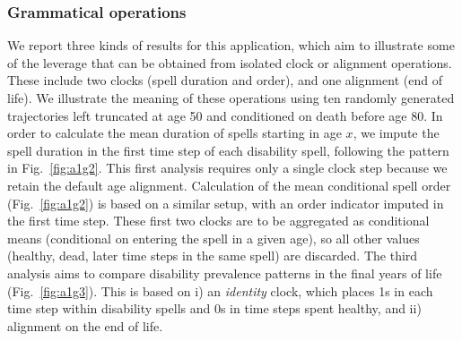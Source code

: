 \documentclass{article}
\begin{document}
\subsubsection{Grammatical operations}
We report three kinds of results for this application, which aim to illustrate some of the leverage that can be obtained from isolated clock or alignment operations. These include two clocks (spell duration and order), and one alignment (end of life). We illustrate the meaning of these operations using ten randomly generated trajectories left truncated at age 50 and conditioned on death before age 80. In order to calculate the mean duration of spells starting in age $x$, we impute the spell duration in the first time step of each disability spell, following the pattern in Fig.~\ref{fig:a1g2}. This first analysis requires only a single clock step because we retain the default age alignment. Calculation of the mean conditional spell order (Fig.~\ref{fig:a1g2}) is based on a similar setup, with an order indicator imputed in the first time step. These first two clocks are to be aggregated as conditional means (conditional on entering the spell in a given age), so all other values (healthy, dead, later time steps in the same spell) are discarded. The third analysis aims to compare disability prevalence patterns in the final years of life (Fig.~\ref{fig:a1g3}). This is based on i) an \emph{identity} clock, which places 1s in each time step within disability spells and 0s in time steps spent healthy, and ii) alignment on the end of life.
\end{document}

